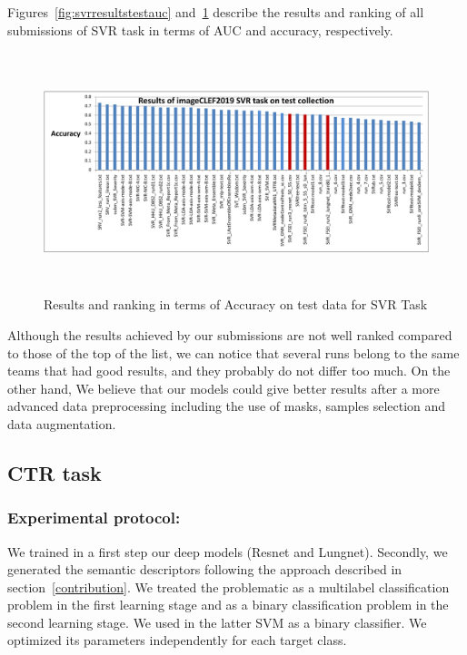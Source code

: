 \documentclass{llncs}
\begin{document}
Figures~\ref{fig:svrresultstestauc} and~\ref{fig:svrresultstestaccuracy} describe the results and ranking of all submissions of SVR task in terms of AUC and accuracy, respectively. 


\begin{figure}[!ht]
\includegraphics[width=12cm,height=7cm]{results_svr_test_accuracy.pdf}
\caption{Results and ranking in terms of Accuracy on test data for SVR Task} 
\label{fig:svrresultstestaccuracy}
\end{figure}

Although the results achieved by our submissions are not well ranked compared to those of the top of the list, we can notice that several runs belong to the same teams that had good results, and they probably do not differ too much. On the other hand, We believe that our models could give better results after a more advanced data preprocessing including the use of masks, samples selection and data augmentation.





\subsection{CTR task}
\subsubsection{Experimental protocol:}

We trained in a first step our deep models (Resnet and Lungnet). Secondly, we generated the semantic descriptors following the approach described in section~\ref{contribution}. We treated the problematic as a multilabel classification problem in the first learning stage and as a binary classification problem in the second learning stage. We used in the latter SVM as a binary classifier. We optimized its parameters independently for each target class.\\
\end{document}
